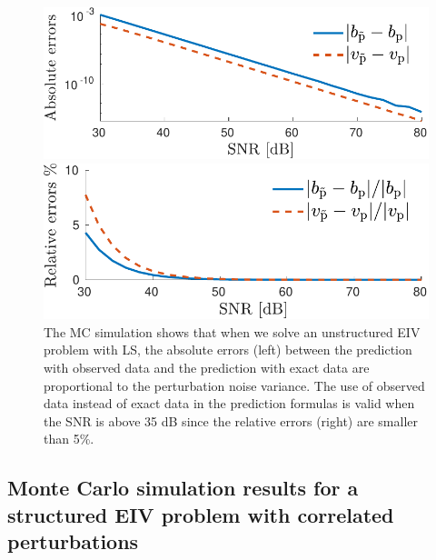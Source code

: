 \begin{figure}[htb!]
    \centering
    \begin{minipage}{0.45\textwidth}
        \centering
        \includegraphics[width=1\textwidth]{./ChapterStatisticalAnalysis/fig/Fig_4l.pdf} 
    \end{minipage}
    \begin{minipage}{0.45\textwidth}
        \centering
        \includegraphics[width=1\textwidth]{./ChapterStatisticalAnalysis/fig/Fig_4r.pdf} 
    \end{minipage}
  \caption{ \label{fig:bv_btvt_abse_rele_unstr_e7} The MC simulation shows that when we solve an unstructured EIV problem with LS, the absolute errors (left) between the prediction with observed data and the prediction with exact data are proportional to the perturbation noise variance. The use of observed data instead of exact data in the prediction formulas is valid when the SNR is above 35 dB since the relative errors (right) are smaller than 5\%. } 
\end{figure}


\subsection{Monte Carlo simulation results for a structured EIV problem with correlated perturbations}

